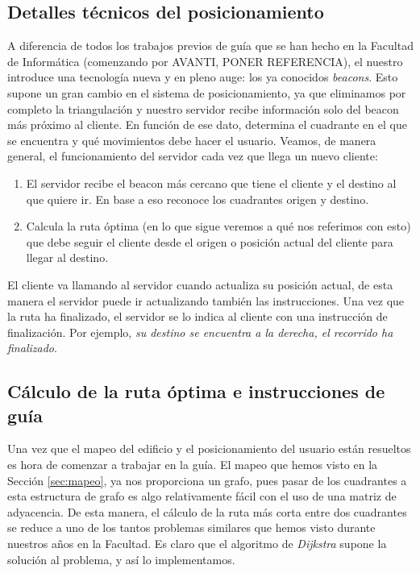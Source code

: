 \subsection{Detalles técnicos del posicionamiento}

A diferencia de todos los trabajos previos de guía que se han hecho en la Facultad de Informática (comenzando por AVANTI, PONER REFERENCIA), el nuestro introduce una tecnología nueva y en pleno auge: los ya conocidos \textit{beacons}. Esto supone un gran cambio en el sistema de posicionamiento, ya que eliminamos por completo la triangulación y nuestro servidor recibe información solo del beacon más próximo al cliente. En función de ese dato, determina el cuadrante en el que se encuentra y qué movimientos debe hacer el usuario.  Veamos, de manera general, el funcionamiento del servidor cada vez que llega un nuevo cliente:

\begin{enumerate}
	\item El servidor recibe el beacon más cercano que tiene el cliente y el destino al que quiere ir. En base a eso reconoce los cuadrantes origen y destino.
	
	\item Calcula la ruta óptima (en lo que sigue veremos a qué nos referimos con esto) que debe seguir el cliente desde el origen o posición actual del cliente para llegar al destino. 
\end{enumerate}

El cliente va llamando al servidor cuando actualiza su posición actual, de esta manera el servidor puede ir actualizando también las instrucciones. Una vez que la ruta ha finalizado, el servidor se lo indica al cliente con una instrucción de finalización. Por ejemplo, \textit{su destino se encuentra a la derecha, el recorrido ha finalizado}.

\subsection{Cálculo de la ruta óptima e instrucciones de guía}
\label{rutaEInst}

Una vez que el mapeo del edificio y el posicionamiento del usuario están resueltos es hora de comenzar a trabajar en la guía. El mapeo que hemos visto en la Sección \ref{sec:mapeo}, ya nos proporciona un grafo, pues pasar de los cuadrantes a esta estructura de grafo es algo relativamente fácil con el uso de una matriz de adyacencia. De esta manera, el cálculo de la ruta más corta entre dos cuadrantes se reduce a uno de los tantos problemas similares que hemos visto durante nuestros años en la Facultad. Es claro que el algoritmo de \textit{Dijkstra} supone la solución al problema, y así lo implementamos.


